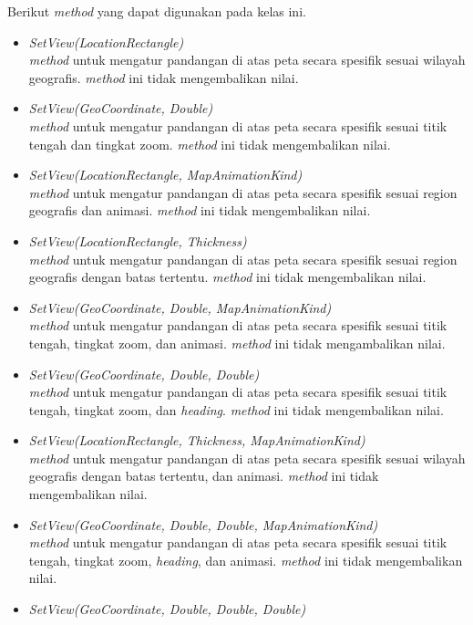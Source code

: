 Berikut \textit{method} yang dapat digunakan pada kelas ini.
\begin{itemize}
	\item \textit{SetView(LocationRectangle)} \\
	\textit{method} untuk mengatur pandangan di atas peta secara spesifik sesuai wilayah geografis. \textit{method} ini tidak mengembalikan nilai.
	\item \textit{SetView(GeoCoordinate, Double)} \\
	\textit{method} untuk mengatur pandangan di atas peta secara spesifik sesuai titik tengah dan tingkat zoom. \textit{method} ini tidak mengembalikan nilai.
	\item \textit{SetView(LocationRectangle, MapAnimationKind)}\\
	\textit{method} untuk mengatur pandangan di atas peta secara spesifik sesuai region geografis dan animasi. \textit{method} ini tidak mengembalikan nilai.
	\item \textit{SetView(LocationRectangle, Thickness)} \\
	\textit{method} untuk mengatur pandangan di atas peta secara spesifik sesuai region geografis dengan batas tertentu. \textit{method} ini tidak mengembalikan nilai.
	\item \textit{SetView(GeoCoordinate, Double, MapAnimationKind)} \\
	\textit{method} untuk mengatur pandangan di atas peta secara spesifik sesuai titik tengah, tingkat zoom, dan animasi. \textit{method} ini tidak mengambalikan nilai.
	\item \textit{SetView(GeoCoordinate, Double, Double)} \\
	\textit{method} untuk mengatur pandangan di atas peta secara spesifik sesuai titik tengah, tingkat zoom, dan \textit{heading}. \textit{method} ini tidak mengembalikan nilai.
	\item \textit{SetView(LocationRectangle, Thickness, MapAnimationKind)} \\
	\textit{method} untuk mengatur pandangan di atas peta secara spesifik sesuai wilayah geografis dengan batas tertentu, dan animasi. \textit{method} ini tidak mengembalikan nilai.
	\item \textit{SetView(GeoCoordinate, Double, Double, MapAnimationKind)} \\
	\textit{method} untuk mengatur pandangan di atas peta secara spesifik sesuai titik tengah, tingkat zoom, \textit{heading}, dan animasi. \textit{method} ini tidak mengembalikan nilai.	
	\item \textit{SetView(GeoCoordinate, Double, Double, Double)} \\

\end{itemize}
